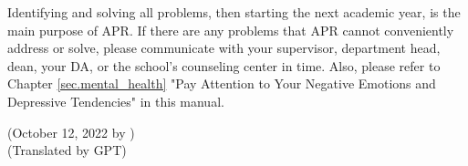 \vspace{5mm}
Identifying and solving all problems, then starting the next academic year, is the main purpose of APR. If there are any problems that APR cannot conveniently address or solve, please communicate with your supervisor, department head, dean, your DA, or the school's counseling center in time. Also, please refer to Chapter \ref{sec.mental_health} "Pay Attention to Your Negative Emotions and Depressive Tendencies" in this manual.

\begin{flushright}
(October 12, 2022 by \Wu) \\
(Translated by GPT)
\end{flushright}